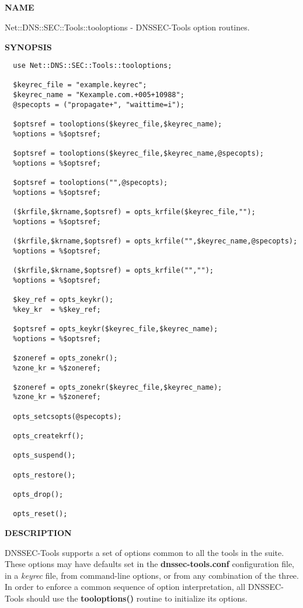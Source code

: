 \clearpage

\subsection{}


{\bf NAME}

Net::DNS::SEC::Tools::tooloptions - DNSSEC-Tools option routines.

{\bf SYNOPSIS}

\begin{verbatim}
  use Net::DNS::SEC::Tools::tooloptions;

  $keyrec_file = "example.keyrec";
  $keyrec_name = "Kexample.com.+005+10988";
  @specopts = ("propagate+", "waittime=i");

  $optsref = tooloptions($keyrec_file,$keyrec_name);
  %options = %$optsref;

  $optsref = tooloptions($keyrec_file,$keyrec_name,@specopts);
  %options = %$optsref;

  $optsref = tooloptions("",@specopts);
  %options = %$optsref;

  ($krfile,$krname,$optsref) = opts_krfile($keyrec_file,"");
  %options = %$optsref;

  ($krfile,$krname,$optsref) = opts_krfile("",$keyrec_name,@specopts);
  %options = %$optsref;

  ($krfile,$krname,$optsref) = opts_krfile("","");
  %options = %$optsref;

  $key_ref = opts_keykr();
  %key_kr  = %$key_ref;

  $optsref = opts_keykr($keyrec_file,$keyrec_name);
  %options = %$optsref;

  $zoneref = opts_zonekr();
  %zone_kr = %$zoneref;

  $zoneref = opts_zonekr($keyrec_file,$keyrec_name);
  %zone_kr = %$zoneref;

  opts_setcsopts(@specopts);

  opts_createkrf();

  opts_suspend();

  opts_restore();

  opts_drop();

  opts_reset();
\end{verbatim}


{\bf DESCRIPTION}

DNSSEC-Tools supports a set of options common to all the tools in the suite.
These options may have defaults set in the {\bf dnssec-tools.conf}
configuration file, in a {\it keyrec} file, from command-line options, or
from any combination of the three.  In order to enforce a common sequence of
option interpretation, all DNSSEC-Tools should use the {\bf tooloptions()}
routine to initialize its options.

